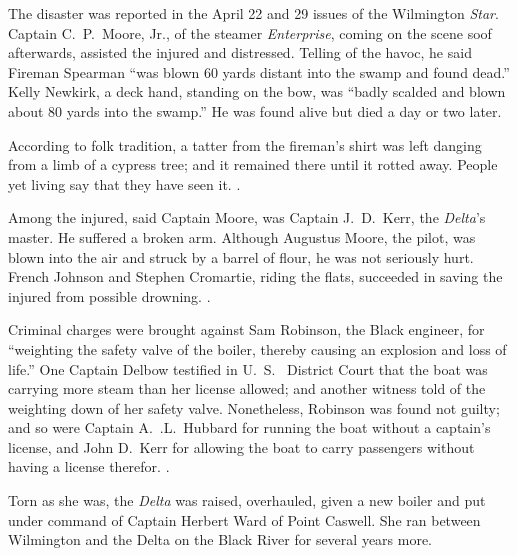 \documentclass[11pt, a5paper, openright]{book}
\newcommand{\steamer}[1]{\textit{#1}\index{#1,~steamer}}
\begin{document}
The disaster was reported in the April 22 and 29 issues of the
Wilmington \emph{Star}.  Captain C.~P.~Moore,
Jr., of the steamer \steamer{Enterprise},
coming on the scene soof afterwards, assisted the injured and
distressed.  Telling of the havoc, he said Fireman
Spearman ``was blown 60 yards
distant into the swamp and found dead.''  Kelly
Newkirk, a deck hand, standing on the
bow, was ``badly scalded and blown about 80 yards into the swamp.''
He was found alive but died a day or two later.\par

According to folk tradition, a tatter from the fireman's shirt was
left danging from a limb of a cypress tree; and it remained there
until it rotted away.  People yet living say that they have seen it.
\citep[]{kellya}\citep[]{corbetth}.\par

Among the injured, said Captain Moore,
was Captain J.~D.\ Kerr, the
\steamer{Delta}'s master.  He suffered a broken arm.  Although
Augustus Moore, the pilot, was blown
into the air and struck by a barrel of flour, he was not seriously
hurt.  French Johnson and Stephen
Cromartie, riding the flats, succeeded in
saving the injured from possible drowning.
\citep[4-22-1887; 4-29-1997]{ws}.\par

Criminal charges were brought against Sam
Robinson, the Black engineer, for
``weighting the safety valve of the boiler, thereby causing an
explosion and loss of life.''  One Captain
Delbow testified in U.~S.~ District Court that
the boat was carrying more steam than her license allowed; and another
witness told of the weighting down of her safety valve.  Nonetheless,
Robinson was found not guilty; and so were Captain
A.~.L.~Hubbard for running the boat
without a captain's license, and John
D.~Kerr for allowing the boat to carry
passengers without having a license therefor.
\citep[7-13-1887]{ws}.\par

Torn as she was, the \steamer{Delta} was raised, overhauled, given a
new boiler and put under command of Captain Herbert
Ward of Point Caswell.  She ran between
Wilmington and the Delta on the Black River for several years
more.\par
\end{document}
